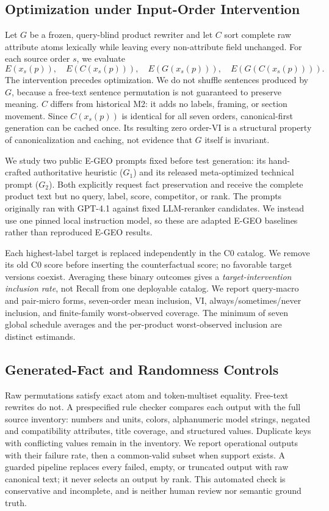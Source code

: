 \subsection{Optimization under Input-Order Intervention}
Let $G$ be a frozen, query-blind product rewriter and let $C$ sort complete raw attribute atoms lexically while leaving every non-attribute field unchanged. For each source order $s$, we evaluate
\begin{equation}
E(x_s(p)),\quad E(C(x_s(p))),\quad E(G(x_s(p))),\quad E(G(C(x_s(p)))).
\end{equation}
The intervention precedes optimization. We do not shuffle sentences produced by $G$, because a free-text sentence permutation is not guaranteed to preserve meaning. $C$ differs from historical M2: it adds no labels, framing, or section movement. Since $C(x_s(p))$ is identical for all seven orders, canonical-first generation can be cached once. Its resulting zero order-VI is a structural property of canonicalization and caching, not evidence that $G$ itself is invariant.

We study two public E-GEO prompts fixed before test generation: its hand-crafted authoritative heuristic ($G_1$) and its released meta-optimized technical prompt ($G_2$). Both explicitly request fact preservation and receive the complete product text but no query, label, score, competitor, or rank. The prompts originally ran with GPT-4.1 against fixed LLM-reranker candidates. We instead use one pinned local instruction model, so these are adapted E-GEO baselines rather than reproduced E-GEO results.

Each highest-label target is replaced independently in the C0 catalog. We remove its old C0 score before inserting the counterfactual score; no favorable target versions coexist. Averaging these binary outcomes gives a \emph{target-intervention inclusion rate}, not Recall from one deployable catalog. We report query-macro and pair-micro forms, seven-order mean inclusion, VI, always/sometimes/never inclusion, and finite-family worst-observed coverage. The minimum of seven global schedule averages and the per-product worst-observed inclusion are distinct estimands.

\subsection{Generated-Fact and Randomness Controls}
Raw permutations satisfy exact atom and token-multiset equality. Free-text rewrites do not. A prespecified rule checker compares each output with the full source inventory: numbers and units, colors, alphanumeric model strings, negated and compatibility attributes, title coverage, and structured values. Duplicate keys with conflicting values remain in the inventory. We report operational outputs with their failure rate, then a common-valid subset when support exists. A guarded pipeline replaces every failed, empty, or truncated output with raw canonical text; it never selects an output by rank. This automated check is conservative and incomplete, and is neither human review nor semantic ground truth.


